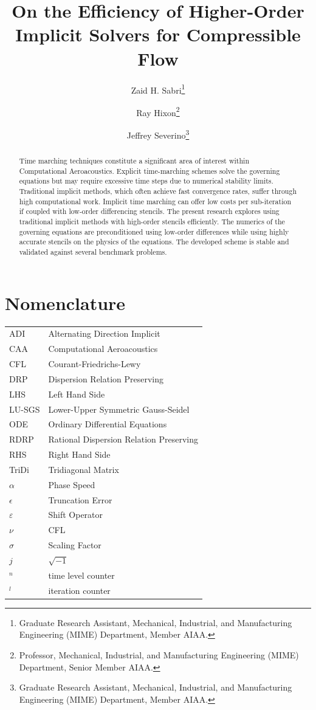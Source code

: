 \documentclass[conf]{new-aiaa}
\title{On the Efficiency of Higher-Order Implicit Solvers for Compressible Flow
}
\author{Zaid H. Sabri\footnote{Graduate Research Assistant, Mechanical, Industrial, and Manufacturing Engineering (MIME) Department, Member AIAA.}}
\author{Ray Hixon\footnote{Professor, Mechanical, Industrial, and Manufacturing Engineering (MIME) Department, Senior Member AIAA.}}
\author{Jeffrey Severino\footnote{Graduate Research Assistant, Mechanical, Industrial, and Manufacturing Engineering (MIME) Department, Member AIAA.}}
\affil{University of Toledo, Toledo, OH, 43606}
\begin{document}
\maketitle

\begin{abstract}

 
Time marching techniques constitute a significant area of interest within Computational Aeroacoustics. 
Explicit time-marching schemes solve the governing equations but may require excessive time steps due to numerical stability limits.
Traditional implicit methods, which often achieve fast convergence rates, suffer through high computational work. 
Implicit time marching can offer low costs per sub-iteration if coupled with low-order differencing stencils. 
The present research explores using traditional implicit methods with high-order stencils efficiently. 
The numerics of the governing equations are preconditioned using low-order differences while using highly accurate stencils on the physics of the equations. 
The developed scheme is stable and validated against several benchmark problems.

\end{abstract}

\section{Nomenclature}

{\renewcommand\arraystretch{1.0}
\noindent\begin{longtable*}{@{}l @{\quad=\quad} l@{}}
ADI & Alternating Direction Implicit \\
CAA  & Computational Aeroacoustics \\
CFL &    Courant-Friedrichs-Lewy \\
DRP & Dispersion Relation Preserving \\
LHS & Left Hand Side \\ 
LU-SGS & Lower-Upper Symmetric Gauss-Seidel \\ 
ODE & Ordinary Differential Equations \\
RDRP & Rational Dispersion Relation Preserving \\
RHS & Right Hand Side \\
TriDi & Tridiagonal Matrix \\
$\alpha$ & Phase Speed \\
$\epsilon$ & Truncation Error \\
$\varepsilon$ & Shift Operator \\
$\nu$ & CFL \\
$\sigma$ & Scaling Factor \\
$j$ & $\sqrt{-1}$ \\
$^{n}$ & time level counter \\
$^{l}$ & iteration counter

\end{longtable*}}
\end{document}
